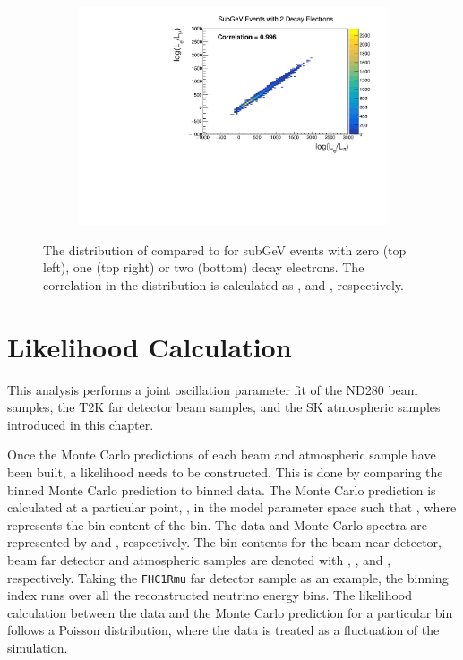 \begin{figure}[h]
\begin{subfigure}[t]{0.49\textwidth}
    \includegraphics[width=\textwidth, trim={0mm 0mm 0mm 0mm}, clip,page=1]{Figures/Selections/Correlation_SG2Dcy.pdf}
  \end{subfigure}
  \caption{The distribution of  compared to  for subGeV events with zero (top left), one (top right) or two (bottom) decay electrons. The correlation in the distribution is calculated as ,  and , respectively.}
  \label{fig:SelsAndSysts_LLHCorrelation}
\end{figure}

\newpage
\section{Likelihood Calculation}
\label{sec:OscillationAnalysis_LLHCalc}

This analysis performs a joint oscillation parameter fit of the ND280 beam samples, the T2K far detector beam samples, and the SK atmospheric samples introduced in this chapter. 

Once the Monte Carlo predictions of each beam and atmospheric sample have been built, a likelihood needs to be constructed. This is done by comparing the binned Monte Carlo prediction to binned data. The Monte Carlo prediction is calculated at a particular point, \quickmath{\vec{\theta}}, in the model parameter space such that , where  represents the bin content of the  bin. The data and Monte Carlo spectra are represented by  and , respectively. The bin contents for the beam near detector, beam far detector and atmospheric samples are denoted with , , and , respectively. Taking the \texttt{FHC1Rmu} far detector sample as an example, the binning index runs over all the reconstructed neutrino energy bins. The likelihood calculation between the data and the Monte Carlo prediction for a particular bin follows a Poisson distribution, where the data is treated as a fluctuation of the simulation. 

